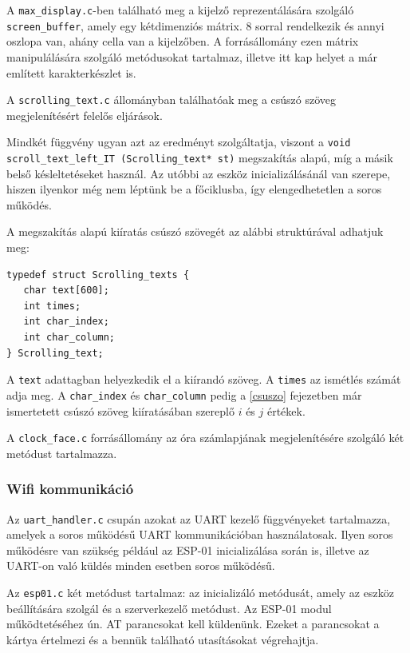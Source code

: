 \documentclass[a4paper, 12pt]{article}
\begin{document}
A \texttt{max\_display.c}-ben található meg a kijelző reprezentálására szolgáló \texttt{screen\_buffer}, amely egy kétdimenziós mátrix. 8 sorral rendelkezik és annyi oszlopa van, ahány cella van a kijelzőben.
A forrásállomány ezen mátrix manipulálására szolgáló metódusokat tartalmaz, illetve itt kap helyet a már említett karakterkészlet is.

\bigskip

A \texttt{scrolling\_text.c} állományban találhatóak meg a csúszó szöveg megjelenítésért felelős eljárások.

\noindent Mindkét függvény ugyan azt az eredményt szolgáltatja, viszont a \texttt{void scroll\_text\_left\_IT (Scrolling\_text* st)} megszakítás alapú, míg a másik belső késleltetéseket használ. Az utóbbi az eszköz inicializálásánál van szerepe, hiszen ilyenkor még nem léptünk be a főciklusba, így elengedhetetlen a soros működés.

A megszakítás alapú kiíratás csúszó szövegét az alábbi struktúrával adhatjuk meg:
\begin{lstlisting}[style=CStyle]
typedef struct Scrolling_texts {
   char text[600];
   int times;
   int char_index;
   int char_column;
} Scrolling_text;
\end{lstlisting}
A \texttt{text} adattagban helyezkedik el a kiírandó szöveg. A \texttt{times} az ismétlés számát adja meg. A \texttt{char\_index} és \texttt{char\_column} pedig a \ref{csuszo} fejezetben már ismertetett csúszó szöveg kiíratásában szereplő $i$ és $j$ értékek. 

\bigskip

A \texttt{clock\_face.c} forrásállomány az óra számlapjának megjelenítésére szolgáló két metódust tartalmazza.

\subsubsection{Wifi kommunikáció}

Az \texttt{uart\_handler.c} csupán azokat az UART kezelő függvényeket tartalmazza, amelyek a soros működésű UART kommunikációban használatosak. Ilyen soros működésre van szükség például az ESP-01 inicializálása során is, illetve az UART-on való küldés minden esetben soros működésű.

\bigskip

Az \texttt{esp01.c} két metódust tartalmaz: az inicializáló metódusát, amely az eszköz beállítására szolgál és a szerverkezelő metódust.
Az ESP-01 modul működtetéséhez ún. AT parancsokat kell küldenünk. Ezeket a parancsokat a kártya értelmezi és a bennük található utasításokat végrehajtja.
\end{document}
